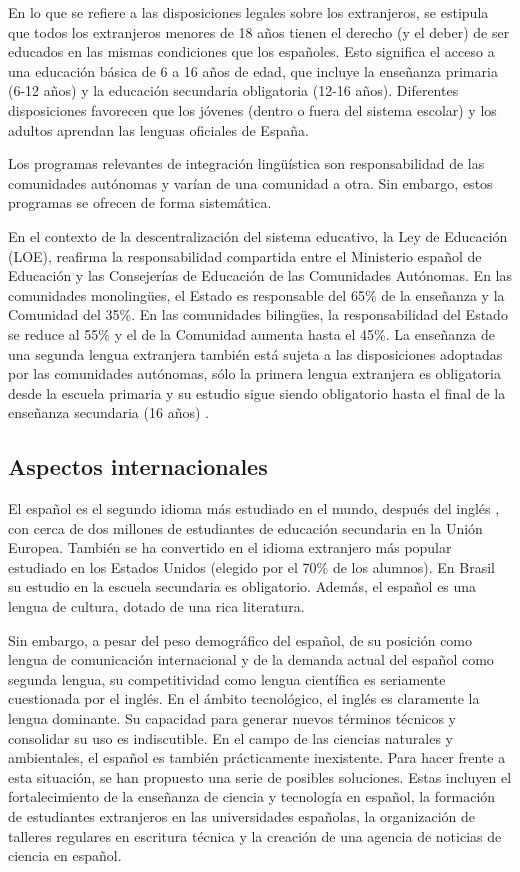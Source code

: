 \begin{multicols}{2}
En lo que se refiere a las disposiciones legales sobre los extranjeros, se estipula que todos los extranjeros menores de 18 años tienen el derecho (y el deber) de ser educados en las mismas condiciones que los españoles. Esto significa el acceso a una educación básica de 6 a 16 años de edad, que incluye la enseñanza primaria (6-12 años) y la educación secundaria obligatoria (12-16 años). Diferentes disposiciones favorecen que los jóvenes (dentro o fuera del sistema escolar) y los adultos aprendan las lenguas oficiales de España.

Los programas relevantes de integración lingüística son responsabilidad de las comunidades autónomas y varían de una comunidad a otra. Sin embargo, estos programas se ofrecen de forma sistemática.

En el contexto de la descentralización del sistema educativo, la Ley de Educación (LOE), reafirma la responsabilidad compartida entre el Ministerio español de Educación y las Consejerías de Educación de las Comunidades Autónomas. En las comunidades monolingües, el Estado es responsable del 65\% de la enseñanza y la Comunidad del 35\%. En las comunidades bilingües, la responsabilidad del Estado se reduce al 55\% y el de la Comunidad aumenta hasta el 45\%. La enseñanza de una segunda lengua extranjera también está sujeta a las disposiciones adoptadas por las comunidades autónomas, sólo la primera lengua extranjera es obligatoria desde la escuela primaria y su estudio sigue siendo obligatorio hasta el final de la enseñanza secundaria (16 años) \cite{Efni1}.

\subsection{Aspectos internacionales}

El español es el segundo idioma más estudiado en el mundo, después del inglés \cite{conespanola}, con cerca de dos millones de estudiantes de educación secundaria en la Unión Europea. También se ha convertido en el idioma extranjero más popular estudiado en los Estados Unidos (elegido por el 70\% de los alumnos). En Brasil su estudio en la escuela secundaria es obligatorio. Además, el español es una lengua de cultura, dotado de una rica literatura.

Sin embargo, a pesar del peso demográfico del español, de su posición como lengua de comunicación internacional y de la demanda actual del español como segunda lengua, su competitividad como lengua científica es seriamente cuestionada por el inglés. En el ámbito tecnológico, el inglés es claramente la lengua dominante. Su capacidad para generar nuevos términos técnicos y consolidar su uso es indiscutible. En el campo de las ciencias naturales y ambientales, el español es también prácticamente inexistente. Para hacer frente a esta situación, se han propuesto una serie de posibles soluciones. Estas incluyen el fortalecimiento de la enseñanza de ciencia y tecnología en español, la formación de estudiantes extranjeros en las universidades españolas, la organización de talleres regulares en escritura técnica y la creación de una agencia de noticias de ciencia en español.


\end{multicols}
